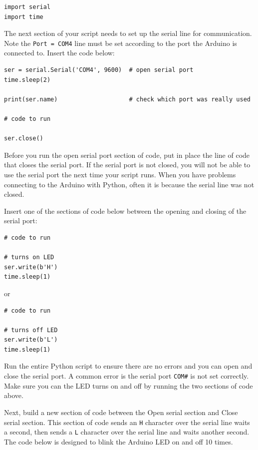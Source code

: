 \begin{verbatim}
import serial
import time
\end{verbatim}

The next section of your script needs to set up the serial line for
communication. Note the
\texttt{Port\ =\ \textquotesingle{}COM4\textquotesingle{}} line must be
set according to the port the Arduino is connected to. Insert the code
below:

\begin{verbatim}
ser = serial.Serial('COM4', 9600)  # open serial port
time.sleep(2)

print(ser.name)                    # check which port was really used

# code to run          

ser.close() 
\end{verbatim}

Before you run the open serial port section of code, put in place the
line of code that closes the serial port. If the serial port is not closed,
you will not be able to use the serial port the next time your script
runs. When you have problems connecting to the Arduino with Python,
often it is because the serial line was not closed.

Insert one of the sections of code below between the opening and closing
of the serial port:

\begin{verbatim}
# code to run 

# turns on LED
ser.write(b'H')
time.sleep(1)
\end{verbatim}

or

\begin{verbatim}
# code to run

# turns off LED
ser.write(b'L')
time.sleep(1)
\end{verbatim}

Run the entire Python script to ensure there are no errors and you can open and
close the serial port. A common error is the serial port
\texttt{\textquotesingle{}COM\#\textquotesingle{}} is not set correctly.
Make sure you can the LED turns on and off by running the two sections
of code above.

Next, build a new section of code between the Open serial section and
Close serial section. This section of code sends an
\texttt{\textquotesingle{}H\textquotesingle{}} character over the serial
line waits a second, then sends a
\texttt{\textquotesingle{}L\textquotesingle{}} character over the serial
line and waits another second. The code below is designed to blink the
Arduino LED on and off 10 times.

